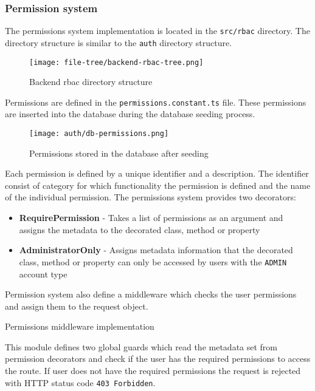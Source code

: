 \documentclass[../main.tex]{subfiles}
\begin{document}
\subsubsection{Permission system}

The permissions system implementation is located in the \texttt{src/rbac} directory. The directory structure is similar to the \texttt{auth} directory structure.

\begin{figure}[H]
  \centering
  \texttt{[image: file-tree/backend-rbac-tree.png]}
  \caption{Backend rbac directory structure}
\end{figure}

Permissions are defined in the \texttt{permissions.constant.ts} file. These permissions are inserted into the database during the database seeding process.
\begin{figure}[H]
  \centering
  \texttt{[image: auth/db-permissions.png]}
  \caption{Permissions stored in the database after seeding}
\end{figure}

Each permission is defined by a unique identifier and a description. The identifier consist of category for which functionality the permission is defined and the name of the individual permission.
The permissions system provides two decorators:
\begin{itemize}
  \item \textbf{RequirePermission} - Takes a list of permissions as an argument and assigns the metadata to the decorated class, method or property
  \item \textbf{AdministratorOnly} - Assigns metadata information that the decorated class, method or property can only be accessed by users with the \texttt{ADMIN} account type
\end{itemize}

Permission system also define a middleware which checks the user permissions and assign them to the request object.

\begin{listing}[H]
  \caption{Permissions middleware implementation}
\end{listing}

This module defines two global guards which read the metadata set from permission decorators and check if the user has the required permissions to access the route.
If user does not have the required permissions the request is rejected with HTTP status code \texttt{403 Forbidden}.
\end{document}
